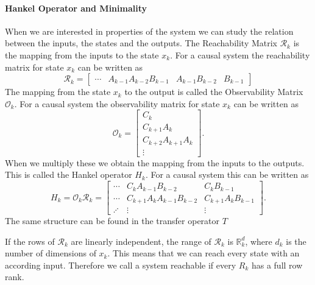 \documentclass[numbers=noenddot,doctype=mastersthesis,BCOR=15mm,biblatex]{ldvbook}%
\newcommand{\R}{\mathcal{R}} %
\newcommand{\Ob}{\mathcal{O}} %
\begin{document}
\paragraph{Hankel Operator and Minimality}
When we are interested in properties of the system we can study the relation between the inputs, the states and the outputs. 
The Reachability Matrix $\R_k$ is the mapping from the inputs to the state $x_k$. For a causal system the reachability matrix for state $x_k$ can be written as
\begin{equation}
	\R_k = \begin{bmatrix}
	 \cdots & A_{k-1}A_{k-2}B_{k-1} &A_{k-1}B_{k-2} &B_{k-1}
	\end{bmatrix}
\end{equation}
The mapping from the state $x_k$ to the output is called the Observability Matrix $\Ob_k$.
For a causal system the observability matrix for state $x_k$ can be written as
\begin{equation}
	\Ob_k = 
	\begin{bmatrix}
		C_k\\
		C_{k+1}A_k\\
		C_{k+2}A_{k+1}A_k\\
		\vdots
	\end{bmatrix}.
\end{equation}
When we multiply these we obtain the mapping from the inputs to the outputs. This is called the Hankel operator $H_k$.
For a causal system this can be written as
\begin{equation}\label{eq:H_def}
	H_k = \Ob_k \R_k = 
		\begin{bmatrix}
\cdots   & C_{k}A_{k-1}B_{k-2} & C_{k}B_{k-1} \\
\cdots   & C_{k+1}A_{k}A_{k-1}B_{k-2} & C_{k+1}A_{k}B_{k-1} \\
\iddots &\vdots &\vdots
\end{bmatrix}
.
\end{equation}
The same structure can be found in the transfer operator $T$%
\vspace*{-0.7cm}

If the rows of $\R_k$ are linearly independent, the range of $\R_k$ is $\mathbb{R}^d_k$, where $d_k$ is the number of dimensions of $x_k$.
This means that we can reach every state with an according input.
Therefore we call a system reachable if every $R_k$ has a full row rank.
\end{document}
